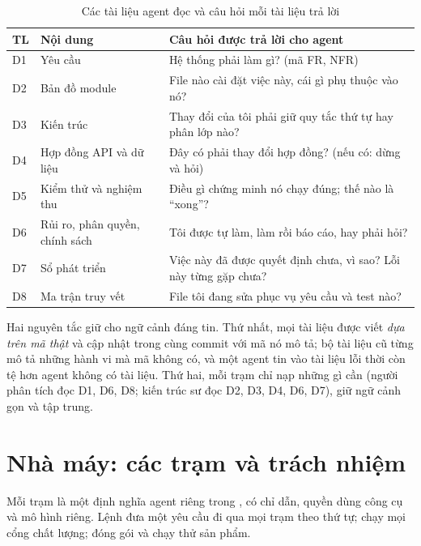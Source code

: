 \documentclass[../main.tex]{subfiles}
\begin{document}
\begin{table}[H]
\centering
\caption{Các tài liệu agent đọc và câu hỏi mỗi tài liệu trả lời}\label{tab:context}
\renewcommand{\arraystretch}{1.2}
\begin{tabular}{|p{1.2cm}|p{4.2cm}|p{8.6cm}|}
\hline
\textbf{TL} & \textbf{Nội dung} & \textbf{Câu hỏi được trả lời cho agent} \\ \hline
D1 & Yêu cầu & Hệ thống phải làm gì? (mã FR, NFR) \\ \hline
D2 & Bản đồ module & File nào cài đặt việc này, cái gì phụ thuộc vào nó? \\ \hline
D3 & Kiến trúc & Thay đổi của tôi phải giữ quy tắc thứ tự hay phân lớp nào? \\ \hline
D4 & Hợp đồng API và dữ liệu & Đây có phải thay đổi hợp đồng? (nếu có: dừng và hỏi) \\ \hline
D5 & Kiểm thử và nghiệm thu & Điều gì chứng minh nó chạy đúng; thế nào là ``xong''? \\ \hline
D6 & Rủi ro, phân quyền, chính sách & Tôi được tự làm, làm rồi báo cáo, hay phải hỏi? \\ \hline
D7 & Sổ phát triển & Việc này đã được quyết định chưa, vì sao? Lỗi này từng gặp chưa? \\ \hline
D8 & Ma trận truy vết & File tôi đang sửa phục vụ yêu cầu và test nào? \\ \hline
\end{tabular}
\end{table}

Hai nguyên tắc giữ cho ngữ cảnh đáng tin. Thứ nhất, mọi tài liệu được viết \emph{dựa trên mã thật}
và cập nhật trong cùng commit với mã nó mô tả; bộ tài liệu cũ từng mô tả những hành vi mà mã không có,
và một agent tin vào tài liệu lỗi thời còn tệ hơn agent không có tài liệu. Thứ hai, mỗi trạm chỉ nạp
những gì cần (người phân tích đọc D1, D6, D8; kiến trúc sư đọc D2, D3, D4, D6, D7), giữ ngữ cảnh gọn
và tập trung.

\section{Nhà máy: các trạm và trách nhiệm}
Mỗi trạm là một định nghĩa agent riêng trong , có chỉ dẫn, quyền dùng công cụ
và mô hình riêng. Lệnh  đưa một yêu cầu đi qua mọi trạm theo thứ tự;
 chạy mọi cổng chất lượng;  đóng gói và chạy thử sản phẩm.
\end{document}
